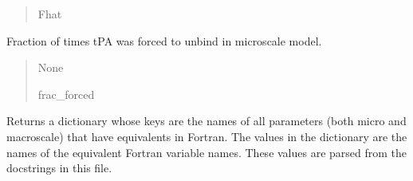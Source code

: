 \documentclass[letterpaper,10pt,english]{sphinxmanual}
\begin{document}
\begin{fulllineitems}
\begin{fulllineitems}
\begin{quote}
\begin{description}
\sphinxAtStartPar
Fhat

\end{description}\end{quote}

\end{fulllineitems}


\begin{fulllineitems}
\label{\detokenize{lysis.util:lysis.util.parameters.MacroParameters.forced_unbind}}
\pysigstartsignatures
{}
\pysigstopsignatures
\sphinxAtStartPar
Fraction of times tPA was forced to unbind in microscale model.
\begin{quote}\begin{description}
\sphinxAtStartPar
None

\sphinxAtStartPar
frac\_forced

\end{description}\end{quote}

\end{fulllineitems}


\begin{fulllineitems}
\label{\detokenize{lysis.util:lysis.util.parameters.MacroParameters.fortran_names}}
\pysigstartsignatures
{}
\pysigstopsignatures
\sphinxAtStartPar
Returns a dictionary whose keys are the names of all parameters (both micro\sphinxhyphen{} and macroscale)
that have equivalents in Fortran. The values in the dictionary are the names of the equivalent
Fortran variable names.
These values are parsed from the docstrings in this file.

\end{fulllineitems}



\end{fulllineitems}
\end{document}
